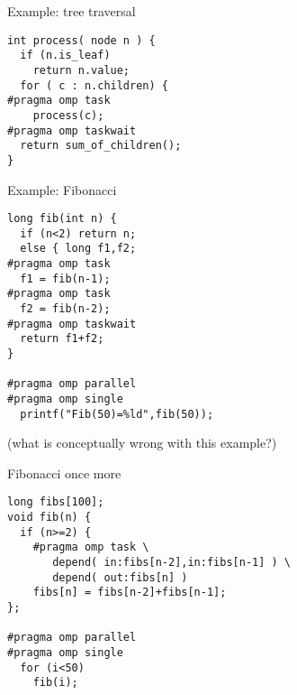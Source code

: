 \begin{frame}[containsverbatim]{Example: tree traversal}
\begin{verbatim}
int process( node n ) {
  if (n.is_leaf)
    return n.value;
  for ( c : n.children) {
#pragma omp task
    process(c);
#pragma omp taskwait
  return sum_of_children();
}
\end{verbatim}
\end{frame}

\begin{frame}[containsverbatim]{Example: Fibonacci}
\begin{verbatim}
long fib(int n) {
  if (n<2) return n;
  else { long f1,f2;
#pragma omp task
  f1 = fib(n-1);
#pragma omp task
  f2 = fib(n-2);
#pragma omp taskwait
  return f1+f2;
}

#pragma omp parallel
#pragma omp single
  printf("Fib(50)=%ld",fib(50));
\end{verbatim}
(what is conceptually wrong with this example?)
\end{frame}

\begin{frame}[containsverbatim]{Fibonacci once more}
\begin{verbatim}
long fibs[100];
void fib(n) {
  if (n>=2) {
    #pragma omp task \
       depend( in:fibs[n-2],in:fibs[n-1] ) \
       depend( out:fibs[n] )
    fibs[n] = fibs[n-2]+fibs[n-1];
};

#pragma omp parallel
#pragma omp single
  for (i<50)
    fib(i);
\end{verbatim}
\end{frame}

\endinput

\begin{frame}[containsverbatim]{}
  \begin{itemize}
  \item 
  \end{itemize}
\end{frame}

\endinput

\begin{frame}[containsverbatim]{}
  \begin{itemize}
  \item 
  \end{itemize}
\end{frame}

